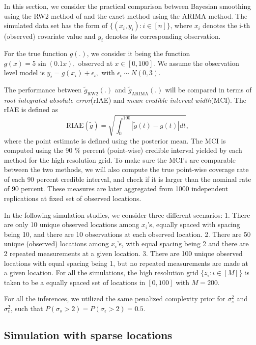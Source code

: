 \documentclass{article}
\begin{document}
In this section, we consider the practical comparison between Bayesian smoothing using the RW2 method of \cite{rw2} and the exact method using the ARIMA method. 
The simulated data set has the form of $\{(x_i,y_i):i\in[n]\}$, where $x_i$ denotes the i-th (observed) covariate value and $y_i$ denotes its corresponding observation. 

For the true function $g(.)$, we consider it being the function $g(x) = 5\sin(0.1x),$ observed at $x \in [0,100]$. We assume the observation level model is $y_i = g(x_i) + \epsilon_i, $ with $\epsilon_i \sim N(0,3)$.

The performance between $\tilde{g}_{\text{RW2}}(.)$ and $\tilde{g}_{\text{ARIMA}}(.)$ will be compared in terms of \textit{root integrated absolute error}(rIAE) and \textit{mean credible interval width}(MCI). The rIAE is defined as $$\text{RIAE}(\tilde{g}) = \sqrt{ \int_0^{100}|\tilde{g}(t)-g(t)|dt},$$ where the point estimate is defined using the posterior mean. The MCI is computed using the 90 \% percent (point-wise) credible interval yielded by each method for the high resolution grid. To make sure the MCI's are comparable between the two methods, we will also compute the true point-wise coverage rate of each 90 percent credible interval, and check if it is larger than the nominal rate of 90 percent. These measures are later aggregated from 1000 independent replications at fixed set of observed locations.

In the following simulation studies, we consider three different scenarios: 1. There are only 10 unique observed locations among $x_i$'s, equally spaced with spacing being 10, and there are 10 observations at each observed location. 2. There are 50 unique (observed) locations among $x_i$'s, with equal spacing being 2 and there are 2 repeated measurements at a given location. 3. There are 100 unique observed locations with equal spacing being 1, but no repeated measurements are made at a given location. For all the simulations, the high resolution grid $\{z_i: i\in [M] \}$ is taken to be a equally spaced set of locations in $[0,100]$ with $M = 200$.

For all the inferences, we utilized the same penalized complexity prior \citep{simpson2017penalising} for $\sigma_s^2$ and $\sigma_\epsilon^2$, such that $P(\sigma_s > 2) = P(\sigma_\epsilon > 2) = 0.5$.


\subsection{Simulation with sparse locations}
\end{document}

